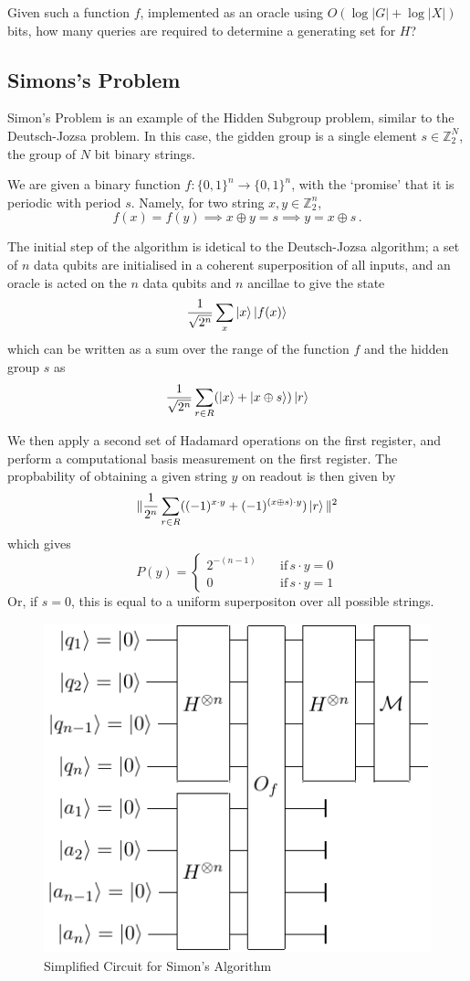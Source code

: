 \documentclass[11pt]{article}
\begin{document}
Given such a function $f$, implemented as an oracle using $O(\log\vert G\vert + \log\vert X\vert)$ bits, how many queries are required to determine a generating set for $H$?

\subsection*{Simons's Problem}
Simon's Problem is an example of the Hidden Subgroup problem, similar to the Deutsch-Jozsa problem. In this case, the gidden group is a single element $s\in\mathbb{Z}_{2}^{N}$, the group of $N$ bit binary strings.

We are given a binary function $f:\{0,1\}^{n}\rightarrow\{0,1\}^{n}$, with the `promise' that it is periodic with period $s$. Namely, for two string $x,y\in\mathbb{Z}_{2}^{n}$,
\begin{equation}
    f(x)=f(y)\implies x\oplus y = s \implies y = x\oplus s\,.
\end{equation}

The initial step of the algorithm is idetical to the Deutsch-Jozsa algorithm; a set of $n$ data qubits are initialised in a coherent superposition of all inputs, and an oracle is acted on the $n$ data qubits and $n$ ancillae to give the state
\begin{equation}
    \frac{1}{\sqrt{2^{n}}}\sum_{x}\ket{x}\ket{f(x)}
\end{equation}
which can be written as a sum over the range of the function $f$ and the hidden group $s$ as
\[\frac{1}{\sqrt{2^{n}}}\sum_{r\in R}(\ket{x}+\ket{x\oplus s})\ket{r}\]

We then apply a second set of Hadamard operations on the first register, and perform a computational basis measurement on the first register. The propbability of obtaining a given string $y$ on readout is then given by
\begin{equation}
    \|\frac{1}{2^{n}}\sum_{r\in R}((-1)^{x\cdot y}+(-1)^{(x\oplus s)\cdot y})\ket{r}\|^{2}
\end{equation}
which gives
\begin{equation}
P(y) = \begin{cases}
2^{-(n-1)} & \quad \text{if} \, s\cdot y = 0\\
0 & \quad \text{if} \, s\cdot y = 1
\end{cases}
\end{equation}
Or, if $s=0$, this is equal to a uniform superpositon over all possible strings.

\begin{figure}
    \centering
    \includegraphics[width=.4\textwidth]{Circuits/simons.pdf}
    \caption{Simplified Circuit for Simon's Algorithm}
\end{figure}
\end{document}
